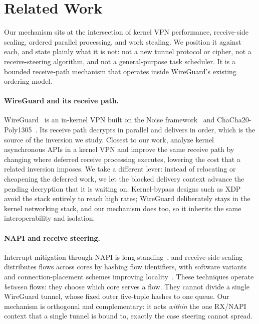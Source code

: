 \section{Related Work}
\label{sec:related}

Our mechanism sits at the intersection of kernel VPN performance, receive-side
scaling, ordered parallel processing, and work stealing. We position it against
each, and state plainly what it is not: not a new tunnel protocol or cipher, not
a receive-steering algorithm, and not a general-purpose task scheduler. It is a
bounded receive-path mechanism that operates inside WireGuard's existing
ordering model.

\paragraph{WireGuard and its receive path.}
WireGuard~\cite{donenfeld2017} is an in-kernel VPN built on the Noise
framework~\cite{noise} and ChaCha20-Poly1305~\cite{rfc8439}. Its receive path
decrypts in parallel and delivers in order, which is the source of the inversion
we study.
Closest to our work, \citet{mounah2025} analyze kernel asynchronous
APIs in a kernel VPN and improve the same receive path by changing where
deferred receive processing executes, lowering the cost that a related inversion
imposes. We take a different lever: instead of relocating or cheapening the
deferred work, we let the blocked delivery context advance the pending
decryption that it is waiting on. Kernel-bypass designs such as
XDP~\cite{hoiland2018xdp} avoid the stack entirely to reach high rates;
WireGuard deliberately stays in the kernel networking stack, and our mechanism
does too, so it inherits the same interoperability and isolation.

\paragraph{NAPI and receive steering.}
Interrupt mitigation through NAPI is long-standing~\cite{salim2001beyond}, and
receive-side scaling distributes flows across cores by hashing flow identifiers,
with software variants and connection-placement schemes improving
locality~\cite{linux-napi,pesterev2012affinity}. These techniques operate
\emph{between} flows: they choose which core serves a flow. They cannot divide a
single WireGuard tunnel, whose fixed outer five-tuple hashes to one queue. Our
mechanism is orthogonal and complementary: it acts \emph{within} the one RX/NAPI
context that a single tunnel is bound to, exactly the case steering cannot
spread.

